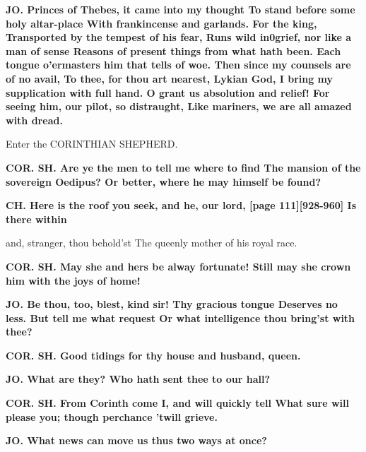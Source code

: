 \documentclass[11pt,letter]{book}
\begin{document}
\par \textbf{JO. Princes of Thebes, it came into my thought To stand before some holy altar-place With frankincense and garlands. For the king, Transported by the tempest of his fear, Runs wild in0grief, nor like a man of sense Reasons of present things from what hath been. Each tongue o’ermasters him that tells of woe. Then since my counsels are of no avail, To thee, for thou art nearest, Lykian God, I bring my supplication with full hand. O grant us absolution and relief! For seeing him, our pilot, so distraught, Like mariners, we are all amazed with dread.}
\par 

\par  Enter the CORINTHIAN SHEPHERD.

\par \textbf{COR. SH. Are ye the men to tell me where to find The mansion of the sovereign Oedipus? Or better, where he may himself be found?}
\par 

\par \textbf{CH. Here is the roof you seek, and he, our lord, [page 111][928-960] Is there within}
\par   and, stranger, thou behold’st The queenly mother of his royal race.

\par \textbf{COR. SH. May she and hers be alway fortunate! Still may she crown him with the joys of home!}
\par 

\par \textbf{JO. Be thou, too, blest, kind sir! Thy gracious tongue Deserves no less. But tell me what request Or what intelligence thou bring’st with thee?}
\par 

\par \textbf{COR. SH. Good tidings for thy house and husband, queen.}
\par 

\par \textbf{JO. What are they? Who hath sent thee to our hall?}
\par 

\par \textbf{COR. SH. From Corinth come I, and will quickly tell What sure will please you; though perchance ’twill grieve.}
\par 

\par \textbf{JO. What news can move us thus two ways at once?}
\par 
\end{document}
